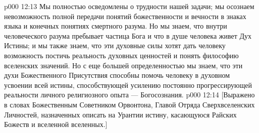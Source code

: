 \vs p000 12:13 Мы полностью осведомлены о трудности нашей задачи; мы осознаем невозможность полной передачи понятий божественности и вечности в знаках языка и конечных понятиях смертного разума. Но мы знаем, что внутри человеческого разума пребывает частица Бога и что в душе человека живет Дух Истины; и мы также знаем, что эти духовные силы хотят дать человеку возможность постичь реальность духовных ценностей и понять философию вселенских значений. Но с еще большей определенностью мы знаем, что эти духи Божественного Присутствия способны помочь человеку в духовном усвоении всей истины, способствующей усилению постоянно прогрессирующей реальности личного религиозного опыта --- Богосознания.
\vsetoff
\vs p000 12:14 [Выражено в словах Божественным Советником Орвонтона, Главой Отряда Сверхвселенских Личностей, назначенных описать на Урантии истину, касающуюся Райских Божеств и вселенной вселенных.]
